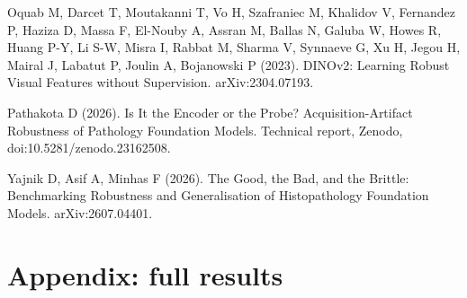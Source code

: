 \documentclass[11pt,a4paper]{article}
\begin{document}
\begin{list}{}{\setlength{\leftmargin}{1.5em}\setlength{\itemindent}{-1.5em}\setlength{\itemsep}{0.25em}\setlength{\parsep}{0pt}}
\item Oquab M, Darcet T, Moutakanni T, Vo H, Szafraniec M, Khalidov V, Fernandez P, Haziza D, Massa F, El-Nouby A, Assran M, Ballas N, Galuba W, Howes R, Huang P-Y, Li S-W, Misra I, Rabbat M, Sharma V, Synnaeve G, Xu H, Jegou H, Mairal J, Labatut P, Joulin A, Bojanowski P (2023). DINOv2: Learning Robust Visual Features without Supervision. arXiv:2304.07193.
\item Pathakota D (2026). Is It the Encoder or the Probe? Acquisition-Artifact Robustness of Pathology Foundation Models. Technical report, Zenodo, doi:10.5281/zenodo.23162508.
\item Yajnik D, Asif A, Minhas F (2026). The Good, the Bad, and the Brittle: Benchmarking Robustness and Generalisation of Histopathology Foundation Models. arXiv:2607.04401.
\end{list}

\clearpage
\appendix
\section*{Appendix: full results}

\renewcommand{\topfraction}{0.95}\renewcommand{\textfraction}{0.02}\renewcommand{\floatpagefraction}{0.9}

\begin{table}[H]\centering\small
\caption{Gain from mixed training in AUC points, mean over five seeds with 95\% bootstrap interval, on all test slides and on macro- and micrometastasis slides against all normal slides. Bold intervals exclude zero.}
\label{tab:gains}
\setlength{\tabcolsep}{3pt}
\resizebox{\linewidth}{!}{}
\end{table}


\end{document}
